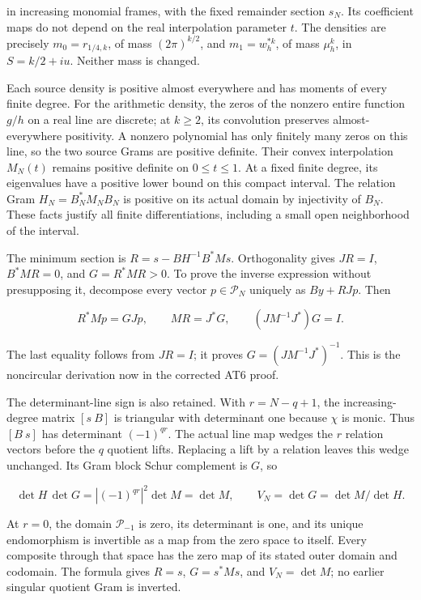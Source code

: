 \documentclass{article}
\begin{document}
in increasing monomial frames, with the fixed remainder section \(s_N\). Its coefficient maps do not depend on the real interpolation parameter \(t\). The densities are precisely \(m_0=r_{1/4,k}\), of mass \((2\pi)^{k/2}\), and \(m_1=w_h^{*k}\), of mass \(\mu_h^k\), in \(S=k/2+iu\). Neither mass is changed.

Each source density is positive almost everywhere and has moments of every finite degree. For the arithmetic density, the zeros of the nonzero entire function \(g/h\) on a real line are discrete; at \(k\ge2\), its convolution preserves almost-everywhere positivity. A nonzero polynomial has only finitely many zeros on this line, so the two source Grams are positive definite. Their convex interpolation \(M_N(t)\) remains positive definite on \(0\le t\le1\). At a fixed finite degree, its eigenvalues have a positive lower bound on this compact interval. The relation Gram \(H_N=B_N^*M_NB_N\) is positive on its actual domain by injectivity of \(B_N\). These facts justify all finite differentiations, including a small open neighborhood of the interval.

The minimum section is \(R=s-BH^{-1}B^*Ms\). Orthogonality gives \(JR=I\), \(B^*MR=0\), and \(G=R^*MR>0\). To prove the inverse expression without presupposing it, decompose every vector \(p\in\mathcal P_N\) uniquely as \(By+RJp\). Then

\[
R^*Mp=GJp,\qquad MR=J^*G,\qquad
(JM^{-1}J^*)G=I.
\tag{RV7}
\]

The last equality follows from \(JR=I\); it proves \(G=(JM^{-1}J^*)^{-1}\). This is the noncircular derivation now in the corrected AT6 proof.

The determinant-line sign is also retained. With \(r=N-q+1\), the increasing-degree matrix \([s\ B]\) is triangular with determinant one because \(\chi\) is monic. Thus \([B\ s]\) has determinant \((-1)^{qr}\). The actual line map wedges the \(r\) relation vectors before the \(q\) quotient lifts. Replacing a lift by a relation leaves this wedge unchanged. Its Gram block Schur complement is \(G\), so

\[
\det H\,\det G
=|(-1)^{qr}|^2\det M=\det M,\qquad
V_N=\det G=\det M/\det H.
\tag{RV8}
\]

At \(r=0\), the domain \(\mathcal P_{-1}\) is zero, its determinant is one, and its unique endomorphism is invertible as a map from the zero space to itself. Every composite through that space has the zero map of its stated outer domain and codomain. The formula gives \(R=s\), \(G=s^*Ms\), and \(V_N=\det M\); no earlier singular quotient Gram is inverted.
\end{document}
